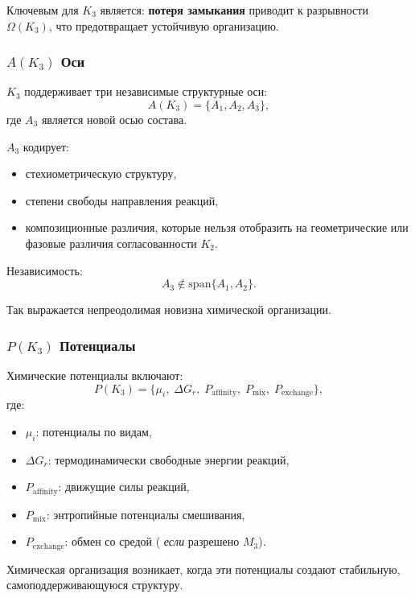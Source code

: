 Ключевым для $K_3$ является:
\textbf{потеря замыкания} приводит к разрывности $\Omega(K_3)$,
что предотвращает устойчивую организацию.

\subsubsection{\texorpdfstring{$A(K_3)$}{A(K_3)} Оси}

$K_3$ поддерживает три независимые структурные оси:
\[
A(K_3) = \{A_1, A_2, A_3\},
\]
где $A_3$ является новой осью состава.

$A_3$ кодирует:
\begin{itemize}
    \item стехиометрическую структуру,
    \item степени свободы направления реакций,
    \item композиционные различия, которые нельзя отобразить на
          геометрические или фазовые различия согласованности $K_2$.
\end{itemize}

Независимость:
\[
A_3 \notin \mathrm{span}\{A_1,A_2\}.
\]

Так выражается непреодолимая новизна химической организации.

\subsubsection{\texorpdfstring{$P(K_3)$}{P(K_3)} Потенциалы}

Химические потенциалы включают:
\[
P(K_3) = \{ \mu_i,\; \Delta G_r,\; P_{\mathrm{affinity}},\;
           P_{\mathrm{mix}},\; P_{\mathrm{exchange}}\},
\]
где:
\begin{itemize}
    \item $\mu_i$: потенциалы по видам,
    \item $\Delta G_r$: термодинамически свободные энергии реакций,
    \item $P_{\mathrm{affinity}}$: движущие силы реакций,
    \item $P_{\mathrm{mix}}$: энтропийные потенциалы смешивания,
    \item $P_{\mathrm{exchange}}$: обмен со средой (
          \emph{если} разрешено $M_3$).
\end{itemize}

Химическая организация возникает, когда эти потенциалы создают
стабильную, самоподдерживающуюся структуру.

